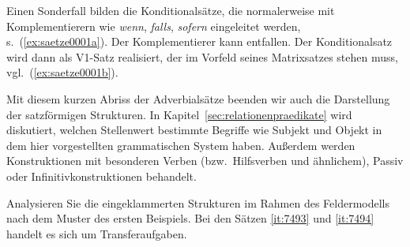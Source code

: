 
Einen Sonderfall bilden die Konditionalsätze, die normalerweise mit Komplementierern wie \textit{wenn}, \textit{falls}, \textit{sofern} eingeleitet werden, s.\ (\ref{ex:saetze0001a}).
Der Komplementierer kann entfallen.
Der Konditionalsatz wird dann als V1-Satz realisiert, der im Vorfeld seines Matrixsatzes stehen muss, vgl.\ (\ref{ex:saetze0001b}).

\begin{exe}
  \ex\label{ex:saetze0001}
  \begin{xlist}
  \end{xlist}
\end{exe}

Mit diesem kurzen Abriss der Adverbialsätze beenden wir auch die Darstellung der satzförmigen Strukturen.
In Kapitel~\ref{sec:relationenpraedikate} wird diskutiert, welchen Stellenwert bestimmte Begriffe wie Subjekt und Objekt in dem hier vorgestellten grammatischen System haben.
Außerdem werden Konstruktionen mit besonderen Verben (bzw.\ Hilfsverben und ähnlichem), \zB Passiv oder Infinitivkonstruktionen behandelt.

\Uebungen

\Uebung \label{u121} Analysieren Sie die eingeklammerten Strukturen im Rahmen des Feldermodells nach dem Muster des ersten Beispiels.
Bei den Sätzen \ref{it:7493} und \ref{it:7494} handelt es sich um Transferaufgaben.

